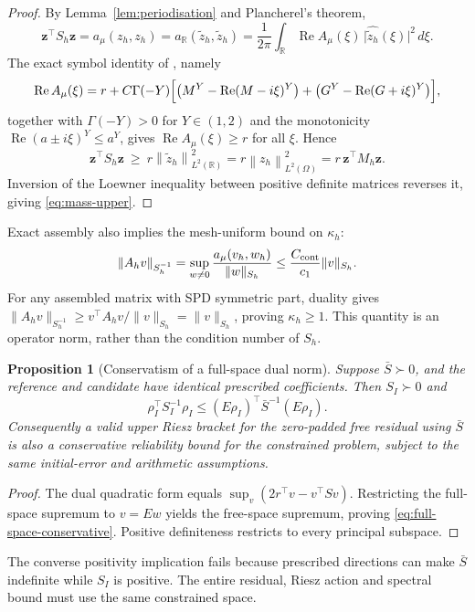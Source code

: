 \documentclass[11pt]{amsart}
\newtheorem{proposition}[theorem]{Proposition}
\theoremstyle{remark}
\newcommand{\R}{\mathbb{R}}
\newcommand{\Mh}{M_h}
\newcommand{\Ah}{A_h}
\newcommand{\Sh}{S_h}
\newcommand{\norm}[1]{\left\lVert #1\right\rVert}
\newcommand{\zz}{\mathbf z}
\newcommand{\rf}{r}
\DeclareMathOperator{\Real}{Re}
\begin{document}
\begin{proof}
By Lemma~\ref{lem:periodisation} and Plancherel's theorem,
\[
  \zz^\top\Sh\zz=a_\mu(z_h,z_h)=a_\R(\widetilde z_h,\widetilde z_h)
  =\frac1{2\pi}\int_\R\Real A_\mu(\xi)\,\bigl|\widehat{\widetilde z_h}(\xi)\bigr|^2\,d\xi .
\]
The exact symbol identity of \cite{DamircheliCGMY2026}, namely
\begin{equation}
\Real A_\mu(\xi)
=\rf+C\Gamma(-Y)\Bigl[\bigl(M^Y-\Real(M-i\xi)^Y\bigr)
+\bigl(G^Y-\Real(G+i\xi)^Y\bigr)\Bigr],
\label{eq:symbol-real-exact}
\end{equation}
together with $\Gamma(-Y)>0$ for $Y\in(1,2)$ and the monotonicity
$\Real(a\pm i\xi)^Y\le a^Y$, gives $\Real A_\mu(\xi)\ge \rf$ for all $\xi$.  Hence
\[
  \zz^\top\Sh\zz\ \ge\ \rf\norm{\widetilde z_h}^2_{L^2(\R)}
  =\rf\norm{z_h}^2_{L^2(\Omega)}=\rf\,\zz^\top\Mh\zz .
\]
Inversion of the Loewner
inequality between positive definite matrices reverses it, giving
\eqref{eq:mass-upper}.
\end{proof}
Exact assembly also implies the mesh-uniform bound on $\kappa_h$:
\[
 \|\Ah v\|_{\Sh^{-1}}
 =\sup_{w\ne0}\frac{a_\mu(v_h,w_h)}{\|w\|_{\Sh}}
 \le\frac{C_{\rm cont}}{c_1}\|v\|_{\Sh}.
\]
For any assembled matrix with SPD symmetric part, duality gives
$\|\Ah v\|_{\Sh^{-1}}\ge v^\top\Ah v/\|v\|_{\Sh}=\|v\|_{\Sh}$,
proving $\kappa_h\ge1$. This quantity is an operator norm, rather than the
condition number of $\Sh$.
\begin{proposition}[Conservatism of a full-space dual norm]
\label{prop:full-space-conservative}
Suppose $\bar S\succ0$, and the reference and candidate have identical
prescribed coefficients. Then $S_I\succ0$ and
\begin{equation}
 \rho_I^\top S_I^{-1}\rho_I
 \le (E\rho_I)^\top\bar S^{-1}(E\rho_I).
 \label{eq:full-space-conservative}
\end{equation}
Consequently a valid upper Riesz bracket for the zero-padded free residual
using $\bar S$ is also a conservative reliability bound for the constrained
problem, subject to the same initial-error and arithmetic assumptions.
\end{proposition}
\begin{proof}
The dual quadratic form equals
$\sup_v(2r^\top v-v^\top S v)$. Restricting the full-space supremum to
$v=Ew$ yields the free-space supremum, proving
\eqref{eq:full-space-conservative}. Positive definiteness restricts to every
principal subspace.
\end{proof}
The converse positivity implication fails because prescribed directions
can make $\bar S$ indefinite while $S_I$ is positive. The entire residual,
Riesz action and spectral bound must use the same constrained space.
\end{document}
